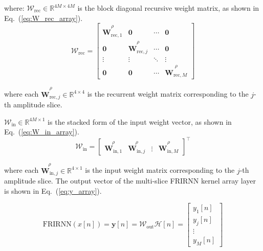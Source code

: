 \documentclass[journal]{IEEEtran}
\newcommand{\midx}{j} %
\newcommand{\mmax}{M} %
\newcommand{\relative}[1]{\overset{\rho}{#1}} %
\newcommand{\Wrecarray}{\mathcal{W}_{\text{rec}}}
\newcommand{\Winarray}{\mathcal{W}_{\text{in}}}
\newcommand{\Woutarray}{\mathcal{W}_{\text{out}}}
\newcommand{\harray}{\mathcal{H}}
\begin{document}
          where: $\Wrecarray \in \mathbb{R}^{4\mmax \times 4\mmax}$ is the block diagonal recursive weight matrix, as shown in Eq.~(\ref{eq:W_rec_array}).
          \begin{equation}
              \Wrecarray = \begin{bmatrix}
                  \relative{\mathbf{W}_{\text{rec},1}} & \mathbf{0}                               & \cdots & \mathbf{0}                               \\
                  \mathbf{0}                           & \relative{\mathbf{W}_{\text{rec},\midx}} & \cdots & \mathbf{0}                               \\
                  \vdots                               & \vdots                                   & \ddots & \vdots                                   \\
                  \mathbf{0}                           & \mathbf{0}                               & \cdots & \relative{\mathbf{W}_{\text{rec},\mmax}}
              \end{bmatrix}
              \label{eq:W_rec_array}
          \end{equation}

          
          where each $\relative{\mathbf{W}_{\text{rec},j}} \in \mathbb{R}^{4 \times 4}$ is the recurrent weight matrix corresponding to the $j$-th amplitude slice.


          $\Winarray \in \mathbb{R}^{4\mmax \times 1}$ is the stacked form of the input weight vector, as shown in Eq.~(\ref{eq:W_in_array}).
          \begin{equation}
              \Winarray = \begin{bmatrix}
                  \relative{\mathbf{W}_{\text{in},1}}    & 
                  \relative{\mathbf{W}_{\text{in},\midx}} &
                  \vdots                                 & 
                  \relative{\mathbf{W}_{\text{in},\mmax}}
              \end{bmatrix} ^\top
              \label{eq:W_in_array}
          \end{equation}

          
          where each $\relative{\mathbf{W}_{\text{in},j}} \in \mathbb{R}^{4 \times 1}$ is the input weight matrix corresponding to the $j$-th amplitude slice.
          The output vector of the multi-slice FRIRNN kernel array layer is shown in Eq.~(\ref{eq:y_array}).


          \begin{equation}
             \mathrm{FRIRNN}(x[n]) = \mathbf{y}[n] = \Woutarray \harray[n] = \begin{bmatrix}
                  y_1[n] \\ y_\midx[n] \\ \vdots \\ y_\mmax[n]
              \end{bmatrix}
              \label{eq:y_array}
          \end{equation}
\end{document}
